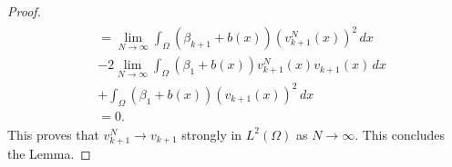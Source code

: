 \documentclass[11pt, a4paper]{article}
\theoremstyle{break}
\theoremstyle{break}
\theoremstyle{break}
\theoremstyle{break}
\theoremstyle{break}
\theoremstyle{break}
\theoremstyle{break}
\theoremstyle{break}
\theoremstyle{break}
\begin{document}
\begin{proof}
\begin{align}
\begin{split}
            &= \lim_{N\rightarrow \infty} \int_\Omega (\beta_{k+1} + b(x))(v_{k+1}^N(x))^2 \, dx \nonumber \\
            &- 2 \lim_{N\rightarrow \infty} \int_\Omega (\beta_1 + b(x))v_{k+1}^N(x)v_{k+1}(x) \, dx \nonumber \\
            &+ \int_\Omega (\beta_1 + b(x))(v_{k+1}(x))^2 \, dx \\
            &= 0.
        \end{split}
    \end{align}
    This proves that $v_{k+1}^N \rightarrow v_{k+1}$ strongly in $L^2(\Omega)$ as $N \rightarrow \infty$. This concludes the Lemma.
\end{proof}



\end{document}

